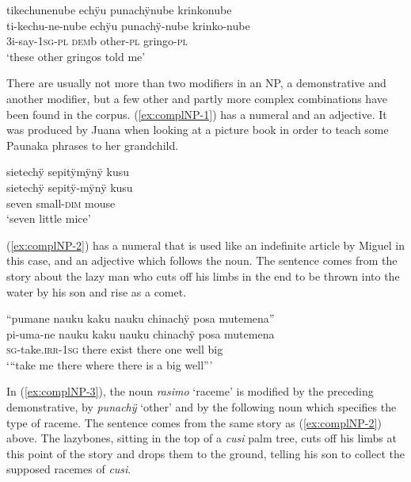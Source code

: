 \ea\label{ex:double-pl}
\begingl
\glpreamble tikechunenube echÿu punachÿnube krinkonube\\
\gla ti-kechu-ne-nube echÿu punachÿ-nube krinko-nube\\
\glb 3i-say-1\textsc{sg}-\textsc{pl} \textsc{dem}b other-\textsc{pl} gringo-\textsc{pl}\\
\glft ‘these other gringos told me’
\endgl
\trailingcitation{[mqx-p110826l.381]}
\xe{}


There are usually not more than two modifiers in an NP, a demonstrative and another modifier, but a few other and partly more complex combinations have been found in the corpus. (\ref{ex:complNP-1}) has a numeral and an adjective. It was produced by Juana when looking at a picture book in order to teach some Paunaka phrases to her grandchild.

\ea\label{ex:complNP-1}
\begingl
\glpreamble sietechÿ sepitÿmÿnÿ kusu\\
\gla sietechÿ sepitÿ-mÿnÿ kusu\\
\glb seven small-\textsc{dim} mouse\\
\glft ‘seven little mice’
\endgl
\trailingcitation{[jxx-e081025s.050]}
\xe


(\ref{ex:complNP-2}) has a numeral that is used like an indefinite article by Miguel in this case, and an adjective which follows the noun. The sentence comes from the story about the lazy man who cuts off his limbs in the end to be thrown into the water by his son and rise as a comet.

\ea\label{ex:complNP-2}
\begingl
\glpreamble “pumane nauku kaku nauku chinachÿ posa mutemena”\\
\gla pi-uma-ne nauku kaku nauku chinachÿ posa mutemena\\
\textsc{sg}-take.\textsc{irr}-1\textsc{sg} there exist there one well big\\
\glft ‘“take me there where there is a big well”’
\endgl
\trailingcitation{[mox-n110920l.121]}
\xe

In (\ref{ex:complNP-3}), the  noun \textit{rasimo} ‘raceme’ is modified by the preceding demonstrative, by \textit{punachÿ} ‘other’ and by the following noun which specifies the type of raceme. The sentence comes from the same story as (\ref{ex:complNP-2}) above. The lazybones, sitting in the top of a \textit{cusi} palm tree, cuts off his limbs at this point of the story and drops them to the ground, telling his son to collect the supposed racemes of \textit{cusi}.

